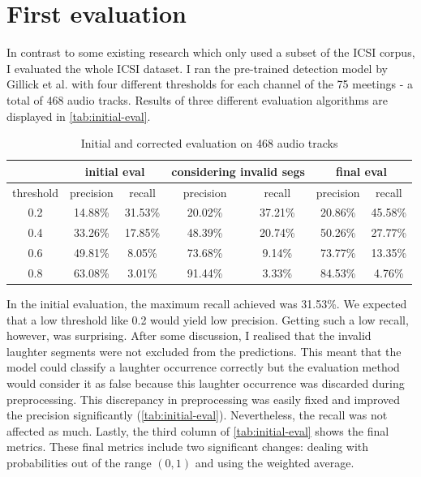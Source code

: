 \documentclass[bsc,frontabs,parskip,deptreport]{infthesis}
\begin{document}
\section{First evaluation}
In contrast to some existing research \citep{kennedy2004laughter, knox2006automatic} which only used a subset of the ICSI corpus, I evaluated the whole ICSI dataset.
I ran the pre-trained detection model by Gillick et al. with four different thresholds for each channel of the 75 meetings - a total of 468 audio tracks. 
Results of three different evaluation algorithms are displayed in \autoref{tab:initial-eval}.

\begin{table}[h!]
    \centering
    \begin{tabular}{|c|c|c|c|c|c|c|}
    \hline
    & \multicolumn{2}{|c|}{initial eval} & \multicolumn{2}{|c|}{considering invalid segs} & \multicolumn{2}{|c|}{final eval}  \\
    \hline 
    threshold & precision & recall & precision & recall & precision & recall  \\
    \hline
        0.2 &  14.88\% & 31.53\% & 20.02\% & 37.21\%  & 20.86\% & 45.58\%\\
        0.4 &  33.26\% & 17.85\% & 48.39\% & 20.74\%  & 50.26\% & 27.77\%\\
        0.6 &  49.81\% & 8.05\% & 73.68\% & 9.14\%    & 73.77\% & 13.35\% \\
        0.8 &  63.08\% & 3.01\% & 91.44\% & 3.33\%    & 84.53\% & 4.76\% \\
     \hline
    \end{tabular}
    \caption{Initial and corrected evaluation on 468 audio tracks}
    \label{tab:initial-eval}
\end{table}


In the initial evaluation, the maximum recall achieved was 31.53\%. We expected that a low threshold like 0.2 would yield low precision. Getting such a low recall, however, was surprising. 
After some discussion, I realised that the invalid laughter segments were not excluded from the predictions. This meant that the model could classify a laughter occurrence correctly but the evaluation method would consider it as false because this laughter occurrence was discarded during preprocessing. This discrepancy in preprocessing was easily fixed and improved the precision significantly (\autoref{tab:initial-eval}). Nevertheless, the recall was not affected as much. 
Lastly, the third column of \autoref{tab:initial-eval} shows the final metrics. 
These final metrics include two significant changes: dealing with probabilities out of the range $(0,1)$ and using the weighted average. 
\end{document}
